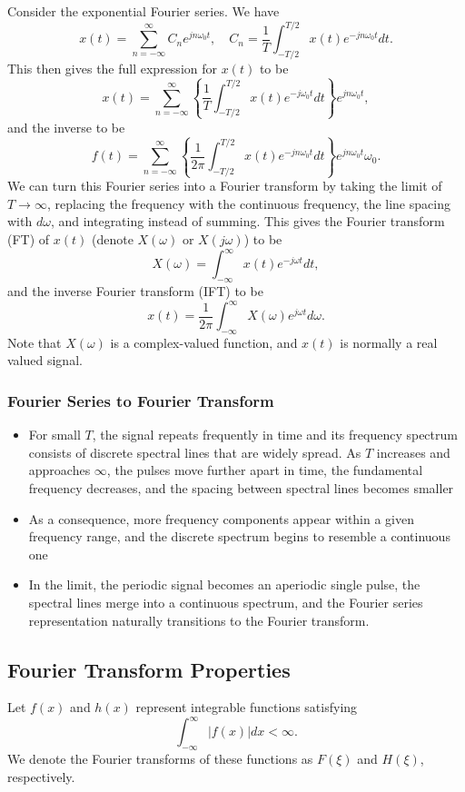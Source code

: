 \documentclass{article}
\begin{document}
Consider the exponential Fourier series. We have 
\[
    x(t)=\sum_{n=-\infty}^{\infty} C_n e^{jn\omega _0t},\quad C_n=\frac{1}{T}\int_{-T/2}^{T/2}x(t)e^{-jn\omega _0t}dt.
\]
This then gives the full expression for $x(t)$ to be
\[
    x(t)=\sum_{n=-\infty}^{\infty} \left\{ \frac{1}{T}\int_{-T/2}^{T/2}x(t)e^{-j\omega _0t}dt \right\}e^{jn\omega _0t},
\]
and the inverse to be
\[
    f(t)=\sum_{n=-\infty}^{\infty} \left\{ \frac{1}{2\pi }\int_{-T/2}^{T/2}x(t)e^{-jn\omega _0t}dt \right\}e^{jn\omega _0t}\omega _0.
\]
We can turn this Fourier series into a Fourier transform by taking the limit of $T\to \infty$, replacing the frequency with the continuous frequency, the line spacing with $d\omega $, and integrating instead of summing. This gives the Fourier transform (FT) of $x(t)$ (denote $X(\omega )$ or $X(j\omega )$) to be
\[
    X(\omega )=\int_{-\infty}^{\infty}x(t)e^{-j\omega t}dt,
\]
and the inverse Fourier transform (IFT) to be
\[
    x(t)=\frac{1}{2\pi }\int_{-\infty}^\infty X(\omega )e^{j\omega t}d\omega .
\]
Note that $X(\omega )$ is a complex-valued function, and $x(t)$ is normally a real valued signal.

\subsubsection{Fourier Series to Fourier Transform}
\begin{itemize}
    \item For small $T$, the signal repeats frequently in time and its frequency spectrum consists of discrete spectral lines that are widely spread. As $T$ increases and approaches $\infty$, the pulses move further apart in time, the fundamental frequency decreases, and the spacing between spectral lines becomes smaller
    \item As a consequence, more frequency components appear within a given frequency range, and the discrete spectrum begins to resemble a continuous one
    \item In the limit, the periodic signal becomes an aperiodic single pulse, the spectral lines merge into a continuous spectrum, and the Fourier series representation naturally transitions to the Fourier transform.
\end{itemize}

\subsection{Fourier Transform Properties}
Let $f(x)$ and $h(x)$ represent integrable functions satisfying
\[
    \int_{-\infty}^\infty \left| f(x) \right|dx <\infty.
\]
We denote the Fourier transforms of these functions as $F(\xi )$ and $H(\xi )$, respectively.
\end{document}
